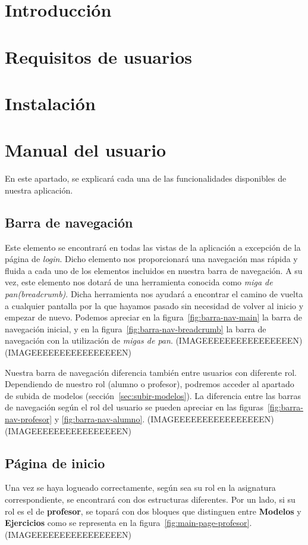 
\section{Introducción}

\section{Requisitos de usuarios}

\section{Instalación}

\section{Manual del usuario}
En este apartado, se explicará cada una de las funcionalidades disponibles de nuestra aplicación.

\subsection{Barra de navegación}\label{sec:barra-navegacion}
Este elemento se encontrará en todas las vistas de la aplicación a excepción de la página de \textit{login}. Dicho elemento nos proporcionará una navegación mas rápida y fluida a cada uno de los elementos incluidos en nuestra barra de navegación. A su vez, este elemento nos dotará de una herramienta conocida como \textit{miga de pan(breadcrumb)}. Dicha herramienta nos ayudará a encontrar el camino de vuelta a cualquier pantalla por la que hayamos pasado sin necesidad de volver al inicio y empezar de nuevo. Podemos apreciar en la figura~\ref{fig:barra-nav-main} la barra de navegación inicial, y en la figura~\ref{fig:barra-nav-breadcrumb} la barra de navegación con la utilización de \textit{migas de pan}.
(IMAGEEEEEEEEEEEEEEEEN)
(IMAGEEEEEEEEEEEEEEEEN)

Nuestra barra de navegación diferencia también entre usuarios con diferente rol. Dependiendo de nuestro rol (alumno o profesor), podremos acceder al apartado de subida de modelos (sección~\ref{sec:subir-modelos}). La diferencia entre las barras de navegación según el rol del usuario se pueden apreciar en las figuras~\ref{fig:barra-nav-profesor} y \ref{fig:barra-nav-alumno}.
(IMAGEEEEEEEEEEEEEEEEN)
(IMAGEEEEEEEEEEEEEEEEN)

\subsection{Página de inicio}
Una vez se haya logueado correctamente, según sea su rol en la asignatura correspondiente, se encontrará con dos estructuras diferentes.
Por un lado, si su rol es el de \textbf{profesor}, se topará con dos bloques que distinguen entre \textbf{Modelos} y \textbf{Ejercicios} como se representa en la figura~\ref{fig:main-page-profesor}.
(IMAGEEEEEEEEEEEEEEEEN)

